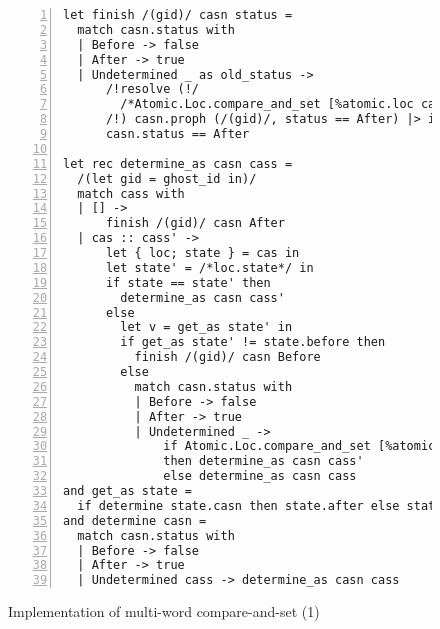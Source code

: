 \begin{figure}[tp]
\begin{lstlisting}[numbers=left]
let finish /(gid)/ casn status =
  match casn.status with
  | Before -> false
  | After -> true
  | Undetermined _ as old_status ->
      /!resolve (!/
        /*Atomic.Loc.compare_and_set [%atomic.loc casn.status] old_status status*/
      /!) casn.proph (/(gid)/, status == After) |> ignore!/ ;
      casn.status == After

let rec determine_as casn cass =
  /(let gid = ghost_id in)/
  match cass with
  | [] ->
      finish /(gid)/ casn After
  | cas :: cass' ->
      let { loc; state } = cas in
      let state' = /*loc.state*/ in
      if state == state' then
        determine_as casn cass'
      else
        let v = get_as state' in
        if get_as state' != state.before then
          finish /(gid)/ casn Before
        else
          match casn.status with
          | Before -> false
          | After -> true
          | Undetermined _ ->
              if Atomic.Loc.compare_and_set [%atomic.loc loc.state] state' state
              then determine_as casn cass'
              else determine_as casn cass
and get_as state =
  if determine state.casn then state.after else state.before
and determine casn =
  match casn.status with
  | Before -> false
  | After -> true
  | Undetermined cass -> determine_as casn cass
\end{lstlisting}
\caption{Implementation of multi-word compare-and-set (1)}
\label{fig:mcas}
\end{figure}